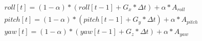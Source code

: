 \begin{equation}
\label{eqn:compfilter}
	\begin{array}{l}
	roll[t] = (1 - \alpha) * (roll[t - 1] + G_{x} * \Delta t) + \alpha * A_{roll} \\
	pitch[t] = (1 - \alpha) * (pitch[t - 1] + G_{y} * \Delta t) + \alpha * A_{pitch} \\ 
	yaw[t] = (1 - \alpha) * (yaw[t - 1] + G_{z} * \Delta t) + \alpha * A_{yaw} 
\end{array}
\end{equation}